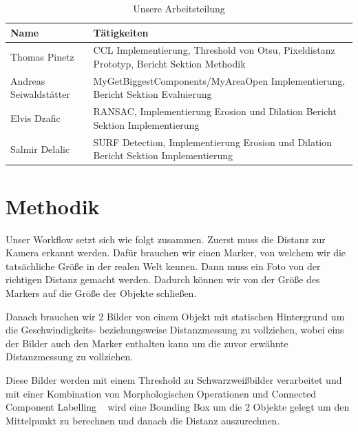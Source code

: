 \documentclass[deutsch]{scrartcl}
\begin{document}
\begin{center}
	\begin{table}[htb]
	\begin{tabularx} {\textwidth}{ |X | X | }
		\hline
		Name & Tätigkeiten\\
		\hline
		Thomas Pinetz & CCL Implementierung, Threshold von Otsu, \newline Pixeldistanz Prototyp, Bericht Sektion Methodik \\
		\hline
		Andreas Seiwaldstätter & MyGetBiggestComponents/MyAreaOpen Implementierung, \newline Bericht Sektion Evaluierung\\
		\hline
		Elvis Dzafic & RANSAC, Implementierung Erosion und Dilation \newline Bericht Sektion Implementierung\\
		\hline
		Salmir Delalic & SURF Detection, Implementierung Erosion und Dilation \newline Bericht Sektion Implementierung\\
		\hline
	\end{tabularx}
		\caption{Unsere Arbeitsteilung}
		\label{table:arbeitsteilung}	
	\end{table}
\end{center}


\section{Methodik}

Unser Workflow setzt sich wie folgt zusammen. Zuerst muss die Distanz zur Kamera erkannt werden. Dafür brauchen wir einen Marker, von welchem wir die tatsächliche Größe in der realen Welt kennen. Dann muss ein Foto von der richtigen Distanz gemacht werden. Dadurch können wir von der Größe des Markers auf die Größe der Objekte schließen. 

Danach brauchen wir 2 Bilder von einem Objekt mit statischen Hintergrund um die Geschwindigkeits- beziehungsweise Distanzmessung zu vollziehen, wobei eins der Bilder auch den Marker enthalten kann um die zuvor erwähnte Distanzmessung zu vollziehen.

Diese Bilder werden mit einem Threshold zu Schwarzweißbilder verarbeitet und mit einer Kombination von Morphologischen Operationen und Connected Component Labelling ~\cite{suzuki2003linear} wird eine Bounding Box um die 2 Objekte gelegt um den Mittelpunkt zu berechnen und danach die Distanz auszurechnen.
\end{document}
